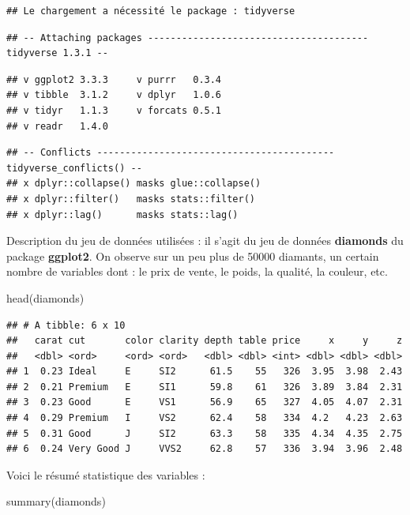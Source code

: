 \documentclass[
]{book}
\newenvironment{Shaded}{\begin{snugshade}}{\end{snugshade}}
\newcommand{\FunctionTok}[1]{\textcolor[rgb]{0.00,0.00,0.00}{#1}}
\newcommand{\NormalTok}[1]{#1}
\theoremstyle{definition}
\theoremstyle{definition}
\theoremstyle{definition}
\theoremstyle{definition}
\theoremstyle{remark}
\begin{document}
\begin{verbatim}
## Le chargement a nécessité le package : tidyverse
\end{verbatim}

\begin{verbatim}
## -- Attaching packages --------------------------------------- tidyverse 1.3.1 --
\end{verbatim}

\begin{verbatim}
## v ggplot2 3.3.3     v purrr   0.3.4
## v tibble  3.1.2     v dplyr   1.0.6
## v tidyr   1.1.3     v forcats 0.5.1
## v readr   1.4.0
\end{verbatim}

\begin{verbatim}
## -- Conflicts ------------------------------------------ tidyverse_conflicts() --
## x dplyr::collapse() masks glue::collapse()
## x dplyr::filter()   masks stats::filter()
## x dplyr::lag()      masks stats::lag()
\end{verbatim}

Description du jeu de données utilisées : il s'agit du jeu de données \textbf{diamonds} du package \textbf{ggplot2}. On observe sur un peu plus de 50000 diamants, un certain nombre de variables dont : le prix de vente, le poids, la qualité, la couleur, etc.

\begin{Shaded}
\begin{Highlighting}[]
\FunctionTok{head}\NormalTok{(diamonds)}
\end{Highlighting}
\end{Shaded}

\begin{verbatim}
## # A tibble: 6 x 10
##   carat cut       color clarity depth table price     x     y     z
##   <dbl> <ord>     <ord> <ord>   <dbl> <dbl> <int> <dbl> <dbl> <dbl>
## 1  0.23 Ideal     E     SI2      61.5    55   326  3.95  3.98  2.43
## 2  0.21 Premium   E     SI1      59.8    61   326  3.89  3.84  2.31
## 3  0.23 Good      E     VS1      56.9    65   327  4.05  4.07  2.31
## 4  0.29 Premium   I     VS2      62.4    58   334  4.2   4.23  2.63
## 5  0.31 Good      J     SI2      63.3    58   335  4.34  4.35  2.75
## 6  0.24 Very Good J     VVS2     62.8    57   336  3.94  3.96  2.48
\end{verbatim}

Voici le résumé statistique des variables :

\begin{Shaded}
\begin{Highlighting}[]
\FunctionTok{summary}\NormalTok{(diamonds)}
\end{Highlighting}
\end{Shaded}
\end{document}
